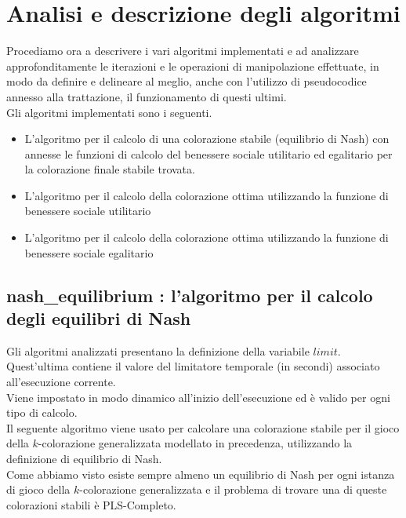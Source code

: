 \section{Analisi e descrizione degli algoritmi}
\justify

Procediamo ora a descrivere i vari algoritmi implementati e ad analizzare approfonditamente le iterazioni e le operazioni di manipolazione effettuate, in modo da definire e delineare al meglio, anche con l'utilizzo di pseudocodice annesso alla trattazione, il funzionamento di questi ultimi.\\

Gli algoritmi implementati sono i seguenti.

\begin{itemize}
	\item L'algoritmo per il calcolo di una colorazione stabile (equilibrio di Nash) con annesse le funzioni di calcolo del benessere sociale utilitario ed egalitario per la colorazione finale stabile trovata.
	\item L'algoritmo per il calcolo della colorazione ottima utilizzando la funzione di benessere sociale utilitario 
	\item L'algoritmo per il calcolo della colorazione ottima utilizzando la funzione di benessere sociale egalitario 
\end{itemize}


\newpage
\subsection{nash\_equilibrium : l'algoritmo per il calcolo degli equilibri di Nash}
\justify
Gli algoritmi analizzati presentano la definizione della variabile $limit$.\\
Quest'ultima contiene il valore del limitatore temporale (in secondi) associato all'esecuzione corrente.\\
Viene impostato in modo dinamico all'inizio dell'esecuzione ed è valido per ogni tipo di calcolo.\\

Il seguente algoritmo viene usato per calcolare una colorazione stabile per il gioco della \(k\)-colorazione generalizzata modellato in precedenza, utilizzando la definizione di equilibrio di Nash.\\

Come abbiamo visto esiste sempre almeno un equilibrio di Nash per ogni istanza di gioco della \(k\)-colorazione generalizzata e il problema di trovare una di queste colorazioni stabili è PLS-Completo.\\

